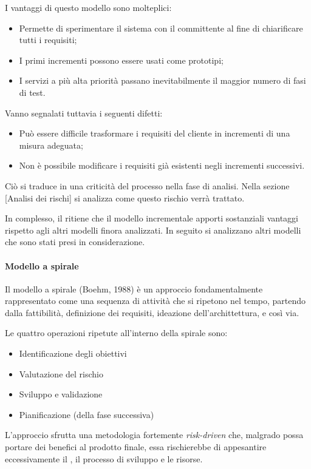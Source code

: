 I vantaggi di questo modello sono molteplici:
\begin{itemize}
\item Permette di sperimentare il sistema con il committente al fine di chiarificare tutti i requisiti;
\item I primi incrementi possono essere usati come prototipi;
\item I servizi a più alta priorità passano inevitabilmente il maggior numero di fasi di test.
\end{itemize}

Vanno segnalati tuttavia i seguenti difetti:
\begin{itemize}
\item Può essere difficile trasformare i requisiti del cliente in incrementi di una misura adeguata;
\item Non è possibile modificare i requisiti già esistenti negli incrementi successivi.
\end{itemize}

Ciò si traduce in una criticità del processo nella fase di analisi. Nella sezione [Analisi dei rischi] si analizza come questo rischio verrà trattato.

In complesso, il  ritiene che il modello incrementale apporti sostanziali vantaggi rispetto agli altri modelli finora analizzati. In seguito si analizzano altri modelli che sono stati presi in considerazione.

			\paragraph{Modello a spirale}
			Il modello a spirale (Boehm, 1988) è un approccio fondamentalmente rappresentato come una sequenza di attività che si ripetono nel tempo, partendo dalla fattibilità, definizione dei requisiti, ideazione dell'archittettura, e così via.
			
			Le quattro operazioni ripetute all'interno della spirale sono:
\begin{itemize}
\item Identificazione degli obiettivi
\item Valutazione del rischio
\item Sviluppo e validazione
\item Pianificazione (della fase successiva)
\end{itemize}			 

L'approccio sfrutta una metodologia fortemente \emph{risk-driven} che, malgrado possa portare dei benefici al prodotto finale, essa rischierebbe di appesantire eccessivamente il , il processo di sviluppo e le risorse.

